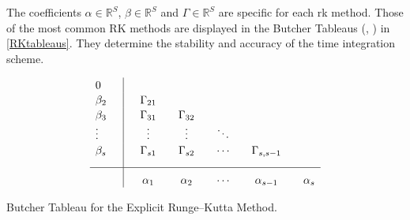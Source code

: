 	The coefficients $\alpha \in \mathbb{R}^S$, $\beta \in \mathbb{R}^S$ and $\Gamma \in \mathbb{R}^S$ are specific for each \gls{rk} method. Those of the most common RK methods are displayed in the Butcher Tableaus (\textcite{butcher}, \textcite{gottlieb}) in \cref{RKtableaus}. They determine the stability and accuracy of the time integration scheme. \\ 
\begin{table}[h]
	\begin{equation*}
		\begin{array}{l | c c c c c}
			\rule{0pt}{2,3ex} 0      \quad &             &               &              &         &   \\
			\rule{0pt}{2,3ex} \beta_2    \quad & \quad \Gamma_{21}  &              &              &         &   \\
			\rule{0pt}{2,3ex} \beta_3    \quad & \quad \Gamma_{31}  & \quad \Gamma_{32}  &              &         &   \\
			\rule{0pt}{2,3ex} \vdots \quad & \quad \vdots & \quad \vdots & \quad \ddots &         &   \\
			\rule{0pt}{2,3ex} \beta_s    \quad & \quad \Gamma_{s1}  & \quad \Gamma_{s2}  & \quad \cdots & \quad \Gamma_{s,s-1} & \\[2,0ex] \hline
			\rule{0pt}{3,3ex}              & \quad \alpha_{1}  & \quad \alpha_{2}    & \quad \cdots & \quad \alpha_{s-1}  & \quad \alpha_{s}
		\end{array}
	\end{equation*}
	\caption{Butcher Tableau for the Explicit Runge–Kutta Method.}
	\label{tab:RKexplicit}
\end{table}		

